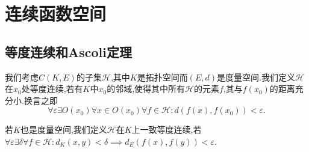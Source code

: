 \documentclass{article}
\begin{document}
\section{连续函数空间}
\subsection{等度连续和Ascoli定理}
我们考虑$C(K,E)$的子集$\mathcal{H}$,其中$K$是拓扑空间而$(E,d)$是度量空间.我们定义$\mathcal{H}$在$x_0$处等度连续,若有$K$中$x_0$的邻域,使得其中所有$\mathcal{H}$的元素$f$,其与$f(x_0)$的距离充分小.换言之即$$\forall \varepsilon\exists O(x_0)\forall x\in O(x_0)\forall f\in \mathcal{H}:d(f(x),f(x_0))<\varepsilon.$$

若$K$也是度量空间,我们定义$\mathcal{H}$在$K$上一致等度连续,若$\forall \varepsilon\exists \delta\forall f\in\mathcal{H}:d_K(x,y)<\delta\implies d_E(f(x),f(y))<\varepsilon$.
\end{document}
